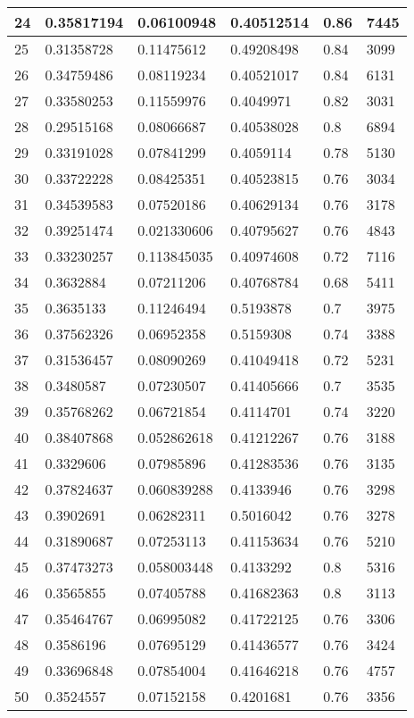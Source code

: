 \begin{longtable}{|l|l|l|l|l|l|}
24 & 0.35817194 & 0.06100948 & 0.40512514 & 0.86 & 7445 \\ \hline 
25 & 0.31358728 & 0.11475612 & 0.49208498 & 0.84 & 3099 \\ \hline 
26 & 0.34759486 & 0.08119234 & 0.40521017 & 0.84 & 6131 \\ \hline 
27 & 0.33580253 & 0.11559976 & 0.4049971 & 0.82 & 3031 \\ \hline 
28 & 0.29515168 & 0.08066687 & 0.40538028 & 0.8 & 6894 \\ \hline 
29 & 0.33191028 & 0.07841299 & 0.4059114 & 0.78 & 5130 \\ \hline 
30 & 0.33722228 & 0.08425351 & 0.40523815 & 0.76 & 3034 \\ \hline 
31 & 0.34539583 & 0.07520186 & 0.40629134 & 0.76 & 3178 \\ \hline 
32 & 0.39251474 & 0.021330606 & 0.40795627 & 0.76 & 4843 \\ \hline 
33 & 0.33230257 & 0.113845035 & 0.40974608 & 0.72 & 7116 \\ \hline 
34 & 0.3632884 & 0.07211206 & 0.40768784 & 0.68 & 5411 \\ \hline 
35 & 0.3635133 & 0.11246494 & 0.5193878 & 0.7 & 3975 \\ \hline 
36 & 0.37562326 & 0.06952358 & 0.5159308 & 0.74 & 3388 \\ \hline 
37 & 0.31536457 & 0.08090269 & 0.41049418 & 0.72 & 5231 \\ \hline 
38 & 0.3480587 & 0.07230507 & 0.41405666 & 0.7 & 3535 \\ \hline 
39 & 0.35768262 & 0.06721854 & 0.4114701 & 0.74 & 3220 \\ \hline 
40 & 0.38407868 & 0.052862618 & 0.41212267 & 0.76 & 3188 \\ \hline 
41 & 0.3329606 & 0.07985896 & 0.41283536 & 0.76 & 3135 \\ \hline 
42 & 0.37824637 & 0.060839288 & 0.4133946 & 0.76 & 3298 \\ \hline 
43 & 0.3902691 & 0.06282311 & 0.5016042 & 0.76 & 3278 \\ \hline 
44 & 0.31890687 & 0.07253113 & 0.41153634 & 0.76 & 5210 \\ \hline 
45 & 0.37473273 & 0.058003448 & 0.4133292 & 0.8 & 5316 \\ \hline 
46 & 0.3565855 & 0.07405788 & 0.41682363 & 0.8 & 3113 \\ \hline 
47 & 0.35464767 & 0.06995082 & 0.41722125 & 0.76 & 3306 \\ \hline 
48 & 0.3586196 & 0.07695129 & 0.41436577 & 0.76 & 3424 \\ \hline 
49 & 0.33696848 & 0.07854004 & 0.41646218 & 0.76 & 4757 \\ \hline 
50 & 0.3524557 & 0.07152158 & 0.4201681 & 0.76 & 3356 \\ \hline 
\end{longtable}